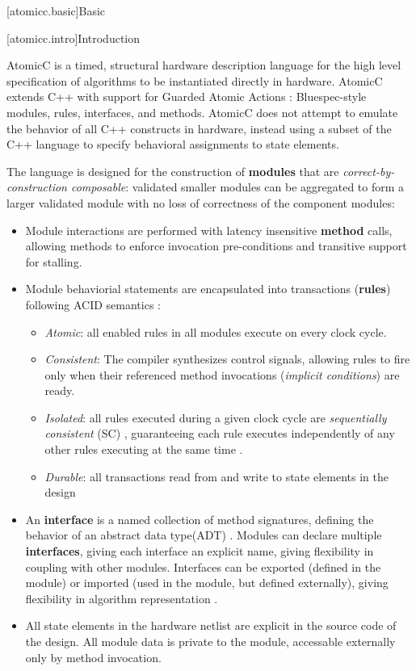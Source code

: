 [atomicc.basic]{Basic}

[atomicc.intro]{Introduction}

AtomicC is a timed, structural hardware description language for
the high level specification of algorithms to be instantiated
directly in hardware.
AtomicC extends C++
with support for Guarded Atomic Actions
\cite{Hoe:Thesis,HoeArvind:TRS_Synthesis2,Dave2007}:
Bluespec-style\cite{Bluespec:www}
modules, rules, interfaces, and methods.
AtomicC does not attempt to emulate the behavior of all C++ constructs in hardware,
instead using a subset of the C++ language to specify behavioral
assignments to state elements.

The language is designed for
the construction of \textbf{modules} that are \textit{correct-by-construction composable}:
validated smaller modules can be aggregated to form
a larger validated module with
no loss of correctness of the component modules:
\begin{itemize}
\item Module interactions are performed with
latency insensitive\cite{Ng2010,AbbasB18}
\textbf{method} calls, allowing methods to enforce invocation pre-conditions
and transitive support for stalling.
\item Module behaviorial statements are encapsulated into transactions (\textbf{rules})
following ACID semantics
\cite{NikhilSemantics,GrayR93}:
\begin{itemize}
\item \textit{Atomic}: all enabled rules in all modules execute on every clock cycle.
\item \textit{Consistent}: The compiler synthesizes control signals, allowing rules to fire
only when their referenced method invocations (\textit{implicit conditions})
are ready.
\item \textit{Isolated}: all rules executed during a given clock cycle are
\textit{sequentially consistent} (SC) \cite{Lamport:1979:MMC:1311099.1311750},
guaranteeing each rule executes
independently of any other rules executing at the same time
\cite[Sec.~7.1]{GrayR93}.
\item \textit{Durable}: all transactions read from and write to state elements in the design
\end{itemize}

\item An \textbf{interface} is a named collection of method signatures, defining
the behavior of an abstract data type(ADT) \cite{Liskov74programmingwith}.
Modules can declare
multiple \textbf{interfaces}, giving each interface an explicit name,
giving flexibility in coupling with other modules.
Interfaces can be exported (defined in the module) or imported (used in
the module, but defined externally), giving flexibility in algorithm
representation \cite[Sec.~4.1]{Dave:ROB}.
\item All state elements in the hardware
netlist are explicit in the source code of the design.
All module data is private to the module, accessable externally only by method invocation.
\end{itemize}

